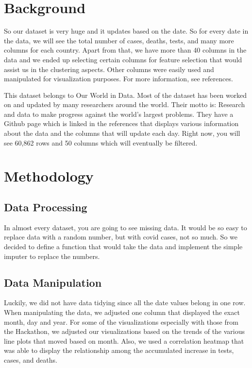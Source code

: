 \documentclass[conference]{IEEEtran}
\begin{document}
\section{Background}
So our dataset is very huge and it updates based on the date. So for every date in the data, we will see the total number of cases, deaths, tests, and many more columns for each country. Apart from that, we have more than 40 columns in the data and we ended up selecting certain columns for feature selection that would assist us in the clustering aspects. Other columns were easily used and manipulated for visualization purposes. For more information, see references. 

This dataset belongs to Our World in Data. Most of the dataset has been worked on and updated by many researchers around the world. Their motto is: Research and data to make progress against the world's largest problems. They have a Github page which is linked in the references that displays various information about the data and the columns that will update each day. Right now, you will see 60,862 rows and 50 columns which will eventually be filtered. 

\section{Methodology}

\subsection{Data Processing}

In almost every dataset, you are going to see missing data. It would be so easy to replace data with a random number, but with covid cases, not so much. So we decided to define a function that would take the data and implement the simple imputer to replace the numbers.  

\subsection{Data Manipulation}

Luckily, we did not have data tidying since all the date values belong in one row. When manipulating the data, we adjusted one column that displayed the exact month, day and year. For some of the visualizations especially with those from the Hackathon, we adjusted our visualizations based on the trends of the various line plots that moved based on month. Also, we used a correlation heatmap that was able to display the relationship among the accumulated increase in tests, cases, and deaths.
\end{document}

